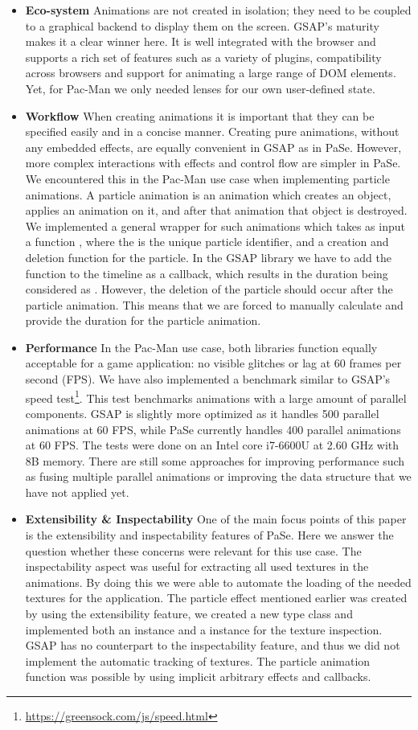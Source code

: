 \begin{itemize}
\item \textbf{Eco-system} Animations are not created in isolation; they need to
be coupled to a graphical backend to display them on the screen.  GSAP's maturity
makes it a clear winner here. It 
is well integrated with the browser and supports a rich set of features
such as a variety of plugins, compatibility across browsers and support for
animating a large range of DOM elements. Yet, for Pac-Man we only needed
lenses for our own user-defined state.
\item \textbf{Workflow} When creating animations it is important that they can be specified easily and in a concise manner. Creating pure animations, without any embedded effects, are equally convenient in GSAP as in PaSe. However, more complex interactions with effects and control flow are simpler in PaSe. We encountered this in the Pac-Man use case when implementing particle animations. A particle animation is an animation which creates an object, applies an animation on it, and after that animation that object is destroyed. We implemented a general wrapper for such animations which takes as input a function , where the  is the unique particle identifier, and a creation and deletion function for the particle. In the GSAP library we have to add the function to the timeline as a callback, which results in the duration being considered as . However, the deletion of the particle should occur after the particle animation. This means that we are forced to manually calculate and provide the duration for the particle animation.
\item \textbf{Performance} In the Pac-Man use case, both libraries function equally acceptable for a game application: no visible glitches or lag at 60 frames per second (FPS). We have also implemented a benchmark similar to GSAP's speed test\footnote{\url{https://greensock.com/js/speed.html}}. This test benchmarks animations with a large amount of parallel components. GSAP is slightly more optimized as it handles 500 parallel animations at 60 FPS, while PaSe currently handles 400 parallel animations at 60 FPS. The tests were done on an Intel core i7-6600U at 2.60 GHz with 8B memory. There are still some approaches for improving performance such as fusing multiple parallel animations or improving the  data structure that we have not applied yet.
\item \textbf{Extensibility \& Inspectability} One of the main focus points of this paper is the extensibility and inspectability features of PaSe. Here we answer the question whether these concerns were relevant for this use case. The inspectability aspect was useful for extracting all used textures in the animations. By doing this we were able to automate the loading of the needed textures for the application. The particle effect mentioned earlier was created by using the extensibility feature, we created a new  type class and implemented both an  instance and a  instance for the texture inspection. GSAP has no counterpart to the inspectability feature, and thus we did not implement the automatic tracking of textures. The particle animation function was possible by using implicit arbitrary effects and callbacks.
\end{itemize}
